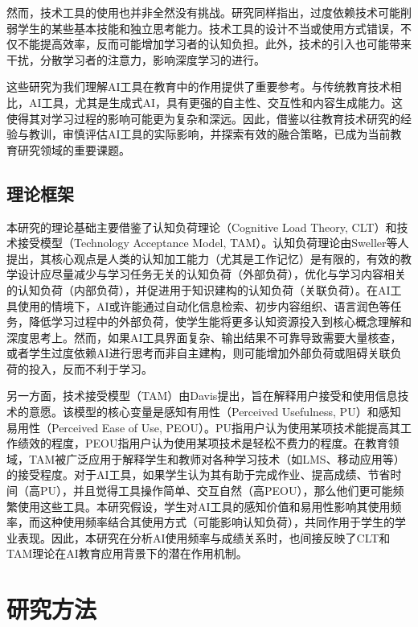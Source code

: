 \documentclass[a4paper,12pt]{article}
\begin{document}
然而，技术工具的使用也并非全然没有挑战。研究同样指出，过度依赖技术可能削弱学生的某些基本技能和独立思考能力\citep{kirschner2006symptoms}。技术工具的设计不当或使用方式错误，不仅不能提高效率，反而可能增加学习者的认知负担。此外，技术的引入也可能带来干扰，分散学习者的注意力，影响深度学习的进行\citep{arends2014instructional}。

这些研究为我们理解AI工具在教育中的作用提供了重要参考。与传统教育技术相比，AI工具，尤其是生成式AI，具有更强的自主性、交互性和内容生成能力。这使得其对学习过程的影响可能更为复杂和深远。因此，借鉴以往教育技术研究的经验与教训，审慎评估AI工具的实际影响，并探索有效的融合策略，已成为当前教育研究领域的重要课题。

\subsection{理论框架}

本研究的理论基础主要借鉴了认知负荷理论（Cognitive Load Theory, CLT）和技术接受模型（Technology Acceptance Model, TAM）。认知负荷理论由Sweller等人提出，其核心观点是人类的认知加工能力（尤其是工作记忆）是有限的，有效的教学设计应尽量减少与学习任务无关的认知负荷（外部负荷），优化与学习内容相关的认知负荷（内部负荷），并促进用于知识建构的认知负荷（关联负荷）\citep{sweller1998cognitive, sweller2011cognitive}。在AI工具使用的情境下，AI或许能通过自动化信息检索、初步内容组织、语言润色等任务，降低学习过程中的外部负荷，使学生能将更多认知资源投入到核心概念理解和深度思考上\citep{zeng2023cognitive}。然而，如果AI工具界面复杂、输出结果不可靠导致需要大量核查，或者学生过度依赖AI进行思考而非自主建构，则可能增加外部负荷或阻碍关联负荷的投入，反而不利于学习。

另一方面，技术接受模型（TAM）由Davis提出，旨在解释用户接受和使用信息技术的意愿\citep{davis1989perceived}。该模型的核心变量是感知有用性（Perceived Usefulness, PU）和感知易用性（Perceived Ease of Use, PEOU）。PU指用户认为使用某项技术能提高其工作绩效的程度，PEOU指用户认为使用某项技术是轻松不费力的程度。在教育领域，TAM被广泛应用于解释学生和教师对各种学习技术（如LMS、移动应用等）的接受程度\citep{schepers2007meta}。对于AI工具，如果学生认为其有助于完成作业、提高成绩、节省时间（高PU），并且觉得工具操作简单、交互自然（高PEOU），那么他们更可能频繁使用这些工具。本研究假设，学生对AI工具的感知价值和易用性影响其使用频率，而这种使用频率结合其使用方式（可能影响认知负荷），共同作用于学生的学业表现。因此，本研究在分析AI使用频率与成绩关系时，也间接反映了CLT和TAM理论在AI教育应用背景下的潜在作用机制。

\section{研究方法}
\end{document}
